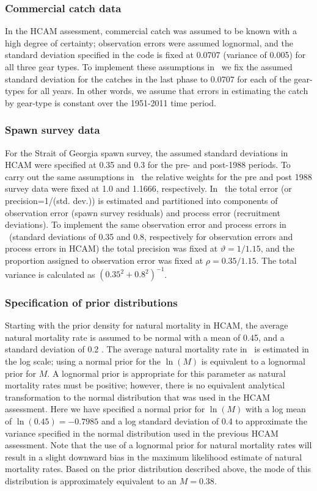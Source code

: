 \subsubsection{Commercial catch data}
	In the HCAM assessment, commercial catch was assumed to be known with a high degree of certainty; observation errors were assumed lognormal, and the standard deviation specified in the code is fixed at 0.0707 (variance of 0.005) for all three gear types. To implement these assumptions in \iscam\ we fix the assumed standard deviation  for the catches in the last phase to 0.0707 for each of the gear-types for all years. In other words, we assume that errors in estimating the catch by gear-type is constant over the 1951-2011 time period.%
	
\subsubsection{Spawn survey data}
 	For the Strait of Georgia spawn survey, the assumed standard deviations in HCAM were specified at 0.35 and 0.3 for the pre- and post-1988 periods.  To carry out the same assumptions in \iscam\ the relative weights for the pre and post 1988 survey data were fixed at 1.0 and 1.1666, respectively.  In \iscam\ the total error (or precision=1/(std. dev.)) is estimated and partitioned into components of observation error (spawn survey residuals) and process error (recruitment deviations).  To implement the same observation error and process errors in  \iscam\  (standard deviations of 0.35 and 0.8, respectively for observation errors and process errors in HCAM) the total precision was fixed at $\vartheta=1/1.15$, and the proportion assigned to observation error was fixed at $\rho = 0.35/1.15$.  The total variance is calculated as $(0.35^2+0.8^2)^{-1}$.

\subsubsection{Specification of prior distributions}
	Starting with the prior density for natural mortality in HCAM, the average natural mortality rate is assumed to be normal with a mean of 0.45, and a standard deviation of 0.2 \citep[see Table 3 in][]{Clear2010}.  The average natural mortality rate in \iscam\ is estimated in the log scale; using a normal prior for the $\ln(M)$ is equivalent to a lognormal prior for $M$.  A lognormal prior is appropriate for this parameter as natural mortality rates must be positive; however, there is no equivalent analytical transformation to the normal distribution that was used in the HCAM assessment.  Here we have specified a  normal prior for $\ln(M)$ with a log mean of $\ln(0.45)=-0.7985$ and a log standard deviation of 0.4 to approximate the variance specified in the normal distribution used in the previous HCAM assessment.  Note that the use of a lognormal prior for natural mortality rates will result in a slight downward bias in the maximum likelihood estimate of natural mortality rates.  Based on the prior distribution described above, the mode of this distribution is approximately equivalent to an $M=0.38$.
	

